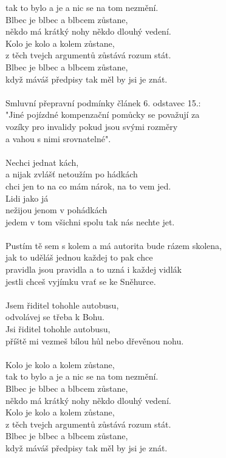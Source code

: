 tak to bylo a je a nic se na tom nezmění.\\
Blbec je blbec a blbcem zůstane,\\
někdo má krátký nohy někdo dlouhý vedení.\\
Kolo je kolo a kolem zůstane,\\
z těch tvejch argumentů zůstává rozum stát.\\
Blbec je blbec a blbcem zůstane,\\
když máváš předpisy tak měl by jsi je znát.\\
\\
Smluvní přepravní podmínky článek 6. odstavec 15.:\\
"Jiné pojízdné kompenzační pomůcky se považují za \\
vozíky pro invalidy pokud jsou svými rozměry\\
a vahou s nimi srovnatelné".\\
\\
Nechci jednat kách,\\
a nijak zvlášť netoužím po hádkách\\
chci jen to na co mám nárok, na to vem jed.\\
Lidi jako já\\
nežijou jenom v pohádkách\\
jedem v tom všichni spolu tak nás nechte jet.\\
\\
Pustím tě sem s kolem a má autorita bude rázem skolena,\\
jak to uděláš jednou každej to pak chce\\
pravidla jsou pravidla a to uzná i každej vidlák\\
jestli chceš vyjímku vrať se ke Sněhurce.\\
\\
Jsem řiditel tohohle autobusu,\\
odvolávej se třeba k Bohu.\\
Jsi řiditel tohohle autobusu,\\
příště mi vezmeš bílou hůl nebo dřevěnou nohu.\\
\\
Kolo je kolo a kolem zůstane,\\
tak to bylo a je a nic se na tom nezmění.\\
Blbec je blbec a blbcem zůstane,\\
někdo má krátký nohy někdo dlouhý vedení.\\
Kolo je kolo a kolem zůstane,\\
z těch tvejch argumentů zůstává rozum stát.\\
Blbec je blbec a blbcem zůstane,\\
když máváš předpisy tak měl by jsi je znát.\\